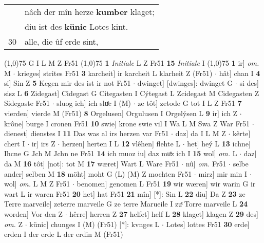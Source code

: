 \documentclass[8pt,a4paper,notitlepage]{article}
\begin{document}
\begin{table}[ht]
\begin{minipage}[t]{0.5\linewidth}
\begin{tabular}{rl}
 & nâch der mîn herze \textbf{kumber} klaget;\\ 
 & diu ist des \textbf{künic} Lotes kint.\\ 
30 & alle, die ûf erde sint,\\ 
\end{tabular}
\scriptsize
\line(1,0){75} \newline
G I L M Z Fr51 \newline
\line(1,0){75} \newline
\textbf{1} \textit{Initiale} L Z Fr51  \textbf{15} \textit{Initiale} I  \newline
\line(1,0){75} \newline
\textbf{1} ir] \textit{om.} M  $\cdot$ krieges] strites Fr51 \textbf{3} karcheit] ir karcheit L klarheit Z (Fr51)  $\cdot$ hât] chan I \textbf{4} si] Sin Z \textbf{5} Kegen mir des ist ir not Fr51  $\cdot$ dwinget] [dwinges]: dwinget G  $\cdot$ si des] sisz L \textbf{6} Zidegast] Cidegast G Citegasten I Cýtegast L Zcidegast M Cidegasten Z Sidegaste Fr51  $\cdot$ sluog ich] ich sluͤc I (M)  $\cdot$ ze tôt] zetode G tot I L Z Fr51 \textbf{7} vierden] vierde M (Fr51) \textbf{8} Orgelusen] Orgulusen I Orgelýsen L \textbf{9} ir] ich Z  $\cdot$ krône] burge I cronen Fr51 \textbf{10} swie] krone swie vil I Wa L M Swa Z War Fr51  $\cdot$ dienest] dienstes I \textbf{11} Das was al irs herzen var Fr51  $\cdot$ daz] da I L M Z  $\cdot$ kêrte] chert I  $\cdot$ ir] irs Z  $\cdot$ herzen] herten I L \textbf{12} vlêhen] flehte L  $\cdot$ het] heý L \textbf{13} ichne] Ihcne G Jch M Jchn ne Fr51 \textbf{14} ich muoz iu] daz muͤz ich I \textbf{15} wol] \textit{om.} L  $\cdot$ daz] da M \textbf{16} tôt] [not]: tot M \textbf{17} wæret] Wart L Ware Fr51  $\cdot$ nû] \textit{om.} Fr51  $\cdot$ selbe ander] selben M \textbf{18} möht] moht G (L) (M) Z mochten Fr51  $\cdot$ mirz] mir min I  $\cdot$ wol] \textit{om.} L M Z Fr51  $\cdot$ benomen] genomen L Fr51 \textbf{19} wir wæren] wir warin G ir wart L ir waren Fr51 \textbf{20} het] hat Fr51 \textbf{21} mîn] [*]: Sin L \textbf{22} diu] Da Z \textbf{23} ze Terre marveile] zeterre marveile G ze terre Marueile I zuͯ Torre marveile L \textbf{24} worden] Vor den Z  $\cdot$ hêrre] herren Z \textbf{27} helfet] helf L \textbf{28} klaget] klagen Z \textbf{29} des] \textit{om.} Z  $\cdot$ künic] chunges I (M) (Fr51) [*]: kvnges  L  $\cdot$ Lotes] lottes Fr51 \textbf{30} erde] erden I der erde L der erdin M (Fr51) \newline
\end{minipage}
\hspace{0.5cm}

\end{table}
\end{document}
